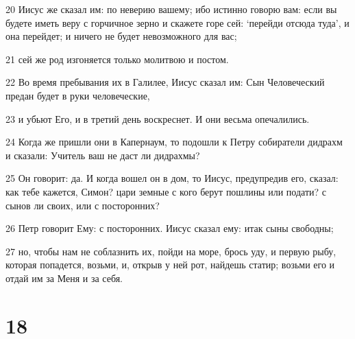 \par 20 Иисус же сказал им: по неверию вашему; ибо истинно говорю вам: если вы будете иметь веру с горчичное зерно и скажете горе сей: `перейди отсюда туда', и она перейдет; и ничего не будет невозможного для вас;
\par 21 сей же род изгоняется только молитвою и постом.
\par 22 Во время пребывания их в Галилее, Иисус сказал им: Сын Человеческий предан будет в руки человеческие,
\par 23 и убьют Его, и в третий день воскреснет. И они весьма опечалились.
\par 24 Когда же пришли они в Капернаум, то подошли к Петру собиратели дидрахм и сказали: Учитель ваш не даст ли дидрахмы?
\par 25 Он говорит: да. И когда вошел он в дом, то Иисус, предупредив его, сказал: как тебе кажется, Симон? цари земные с кого берут пошлины или подати? с сынов ли своих, или с посторонних?
\par 26 Петр говорит Ему: с посторонних. Иисус сказал ему: итак сыны свободны;
\par 27 но, чтобы нам не соблазнить их, пойди на море, брось уду, и первую рыбу, которая попадется, возьми, и, открыв у ней рот, найдешь статир; возьми его и отдай им за Меня и за себя.

\chapter{18}

